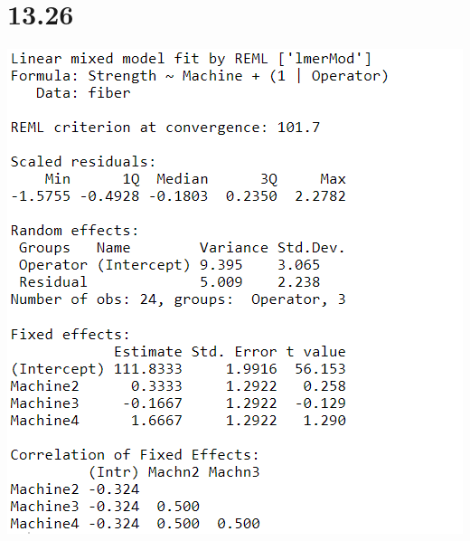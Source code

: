 \documentclass{article}
\begin{document}
\section*{13.26}
\includegraphics{13.26.PNG}
\end{document}
